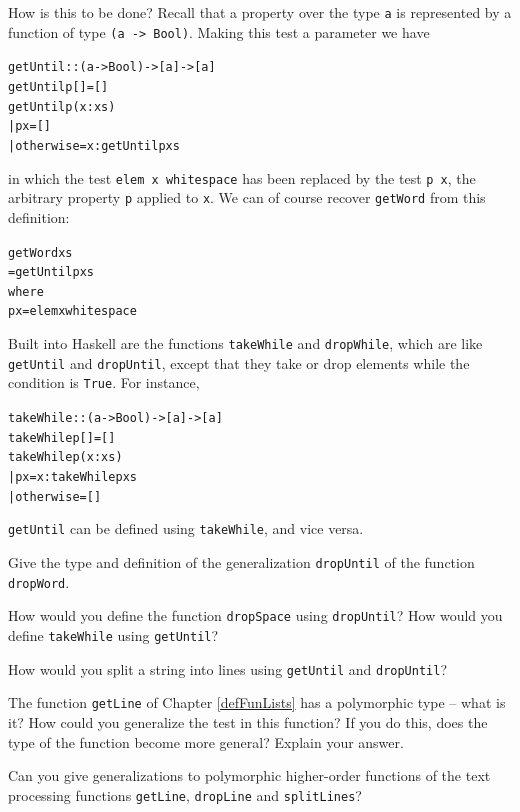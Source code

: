 How is this to be done? Recall that a property over the type \texttt{a} is
represented by a function of type \texttt{(a -> Bool)}. Making this test a
parameter we have
\begin{alltt}
getUntil :: (a -> Bool) -> [a] -> [a]
getUntil p []    = [] 
getUntil p (x:xs) 
  | p x         = []
  | otherwise   = x : getUntil p xs
\end{alltt}
in which the test \texttt{elem x whitespace} has been replaced by the test 
\texttt{p x}, the arbitrary property \texttt{p} applied to \texttt{x}. We can of course
recover \texttt{getWord} from this definition: 
\begin{alltt}
getWord xs 
  = getUntil p xs
    where 
    p x = elem x whitespace
\end{alltt}
Built into Haskell are the functions \texttt{takeWhile}
and \texttt{dropWhile},
which are like \texttt{getUntil} and \texttt{dropUntil}, except that
they take or drop
elements while the condition is \texttt{True}. For instance,
\begin{alltt}
takeWhile :: (a -> Bool) -> [a] -> [a]
takeWhile p []    = [] 
takeWhile p (x:xs) 
  | p x         = x : takeWhile p xs
  | otherwise   = []
\end{alltt}
\texttt{getUntil} can be defined using \texttt{takeWhile}, and vice versa.



\begin{exercises}

\item
Give the type and definition of the generalization \texttt{dropUntil} of the function
\texttt{dropWord}.

\item
How would you define the function \texttt{dropSpace} using \texttt{dropUntil}?
How would you define \texttt{takeWhile}
using \texttt{getUntil}?

\item
How would you split a string into lines using \texttt{getUntil} and \texttt{dropUntil}?

\item
The function \texttt{getLine} of Chapter \ref{defFunLists} has a polymorphic type --
what is it? How could you generalize the test in this function? If you do
this, does the type of the function become more general? Explain your
answer.

\item
Can you give generalizations to polymorphic higher-order functions of the 
text processing functions \texttt{getLine}, \texttt{dropLine} and \texttt{splitLines}? 
\end{exercises}



